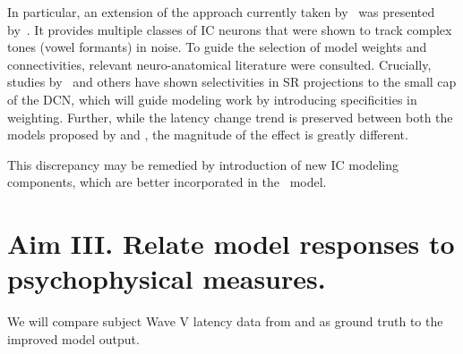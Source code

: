 In particular, an extension of the approach currently taken by~\cite{Verhulst2015Functional} was presented by~\cite{Carney2015Speech}.  It provides multiple classes of IC neurons that were shown to track complex tones (vowel formants) in noise.  To guide the selection of model weights and connectivities, relevant neuro-anatomical literature were consulted.  Crucially, studies by~\cite{Ryugo2008Projections} and others have shown selectivities in SR projections to the small cap of the DCN, which will guide modeling work by introducing specificities in weighting. Further, while the latency change trend is preserved between both the models proposed by \citeauthor{Zilany2014Updated} and \citeauthor{Verhulst2015Functional}, the magnitude of the effect is greatly different.  

This discrepancy may be remedied by introduction of new IC modeling components, which are better incorporated in the~\cite{Zilany2014Updated} model.

\section{Aim III. Relate model responses to psychophysical measures.}  
We will compare subject Wave V latency data from \citeauthor{Mehraei2015Auditory} and \citeauthor{Mehraei2015Individual} as ground truth to the improved model output.